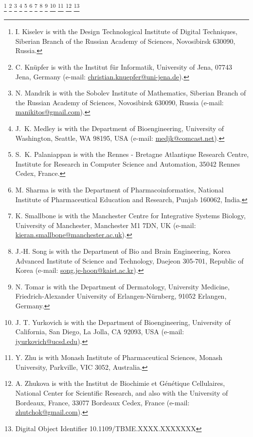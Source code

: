 \documentclass[journal,transmag]{IEEEtran}
\newcommand{\email}[1]{\href{mailto:#1}{#1}}
\begin{document}
{    \thanks{I. Kiselev is with the Design Technological Institute of Digital Techniques, Siberian Branch of the Russian Academy of Sciences, Novosibirsk 630090, Russia.}
    \thanks{C. Kn\"{u}pfer is with the Institut f\"ur Informatik, University of Jena, 07743 Jena, Germany (e-mail: \email{christian.knuepfer@uni-jena.de}).}
    \thanks{N. Mandrik is with the Sobolev Institute of Mathematics, Siberian Branch of the Russian Academy of Sciences, Novosibirsk 630090, Russia (e-mail: \email{manikitos@gmail.com}).}
    \thanks{J.~K. Medley is with the Department of Bioengineering, University of Washington, Seattle, WA 98195, USA (e-mail: \email{medjk@comcast.net}).}
    \thanks{S.~K. Palaniappan is with the Rennes - Bretagne Atlantique Research Centre, Institute for Research in Computer Science and Automation, 35042 Rennes Cedex, France.}
    \thanks{M. Sharma is with the Department of Pharmacoinformatics, National Institute of Pharmaceutical Education and Research, Punjab 160062, India.}
    \thanks{K. Smallbone is with the Manchester Centre for Integrative Systems Biology, University of Manchester, Manchester M1 7DN, UK (e-mail: \email{kieran.smallbone@manchester.ac.uk}).}
    \thanks{J.-H. Song is with the Department of Bio and Brain Engineering, Korea Advanced Institute of Science and Technology, Daejeon 305-701, Republic of Korea (e-mail: \email{song.je-hoon@kaist.ac.kr}).}
    \thanks{N. Tomar is with the Department of Dermatology, University Medicine, Friedrich-Alexander University of Erlangen-N\"urnberg, 91052 Erlangen, Germany.}
    \thanks{J. T. Yurkovich is with the Department of Bioengineering, University of California, San Diego, La Jolla, CA 92093, USA (e-mail: \email{jyurkovich@ucsd.edu}).}
    \thanks{Y. Zhu is with Monash Institute of Pharmaceutical Sciences, Monash University, Parkville, VIC 3052, Australia.}
    \thanks{A. Zhukova is with the Institut de Biochimie et Génétique Cellulaires, National Center for Scientific Research, and also with the University of Bordeaux, France, 33077 Bordeaux Cedex, France (e-mail: \email{zhutchok@gmail.com}).}
    \thanks{Digital Object Identifier 10.1109/TBME.XXXX.XXXXXXX}
}

\maketitle
\end{document}
